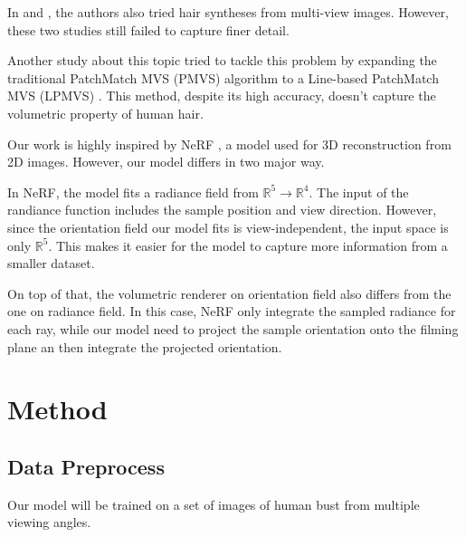 \documentclass[12pt]{article}
\begin{document}
  In \cite{sklyarova_neural_2023} and \cite{rosu_neural_2022}, the authors also tried hair syntheses from multi-view images. However, these two studies still failed to capture finer detail.

  Another study about this topic tried to tackle this problem by expanding the traditional PatchMatch MVS (PMVS) algorithm to a Line-based PatchMatch MVS (LPMVS) \cite{nam_strand-accurate_nodate}. This method, despite its high accuracy, doesn't capture the volumetric property of human hair.

  Our work is highly inspired by NeRF \cite{mildenhall_nerf_2020}, a model used for 3D reconstruction from 2D images. However, our model differs in two major way.

  In NeRF, the model fits a radiance field from $\mathbb{R}^{5} \rightarrow \mathbb{R}^{4}$. The input of the randiance function includes the sample position and view direction. However, since the orientation field our model fits is view-independent, the input space is only $\mathbb{R}^{5}$. This makes it easier for the model to capture more information from a smaller dataset.

  On top of that, the volumetric renderer on orientation field also differs from the one on radiance field. In this case, NeRF only integrate the sampled radiance for each ray, while our model need to project the sample orientation onto the filming plane an then integrate the projected orientation.

  \section{Method}
    \subsection{Data Preprocess}
    
    Our model will be trained on a set of images of human bust from multiple viewing angles.
\end{document}
